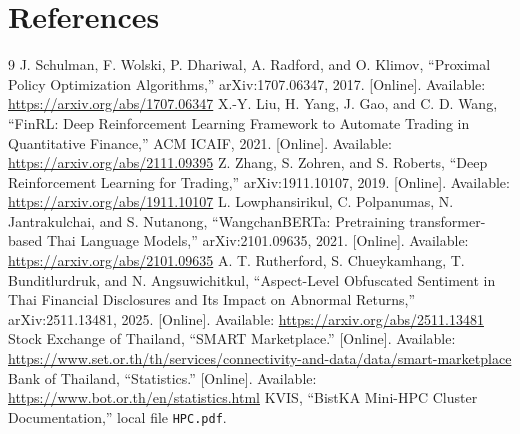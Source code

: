 \documentclass[11pt]{article}
\begin{document}
\section{References}
\begin{thebibliography}{9}
 J. Schulman, F. Wolski, P. Dhariwal, A. Radford, and O. Klimov, ``Proximal Policy Optimization Algorithms,'' arXiv:1707.06347, 2017. [Online]. Available: \url{https://arxiv.org/abs/1707.06347}
 X.-Y. Liu, H. Yang, J. Gao, and C. D. Wang, ``FinRL: Deep Reinforcement Learning Framework to Automate Trading in Quantitative Finance,'' ACM ICAIF, 2021. [Online]. Available: \url{https://arxiv.org/abs/2111.09395}
 Z. Zhang, S. Zohren, and S. Roberts, ``Deep Reinforcement Learning for Trading,'' arXiv:1911.10107, 2019. [Online]. Available: \url{https://arxiv.org/abs/1911.10107}
 L. Lowphansirikul, C. Polpanumas, N. Jantrakulchai, and S. Nutanong, ``WangchanBERTa: Pretraining transformer-based Thai Language Models,'' arXiv:2101.09635, 2021. [Online]. Available: \url{https://arxiv.org/abs/2101.09635}
 A. T. Rutherford, S. Chueykamhang, T. Bunditlurdruk, and N. Angsuwichitkul, ``Aspect-Level Obfuscated Sentiment in Thai Financial Disclosures and Its Impact on Abnormal Returns,'' arXiv:2511.13481, 2025. [Online]. Available: \url{https://arxiv.org/abs/2511.13481}
 Stock Exchange of Thailand, ``SMART Marketplace.'' [Online]. Available: \url{https://www.set.or.th/th/services/connectivity-and-data/data/smart-marketplace}
 Bank of Thailand, ``Statistics.'' [Online]. Available: \url{https://www.bot.or.th/en/statistics.html}
 KVIS, ``BistKA Mini-HPC Cluster Documentation,'' local file \texttt{HPC.pdf}.
\end{thebibliography}
\end{document}
